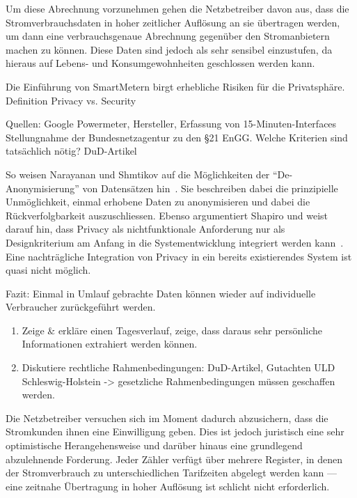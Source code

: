\documentclass[12pt,BCOR=8.5mm]{scrartcl}
\begin{document}
Um diese Abrechnung vorzunehmen gehen die Netzbetreiber davon aus, dass
die Stromverbrauchsdaten in hoher zeitlicher Auflösung an sie
übertragen werden, um dann eine verbrauchsgenaue Abrechnung gegenüber
den Stromanbietern machen zu können.
Diese Daten sind jedoch als sehr sensibel einzustufen, da hieraus auf
Lebens- und Konsumgewohnheiten geschlossen werden kann.


Die Einführung von SmartMetern birgt erhebliche Risiken für die
Privatsphäre. Definition Privacy vs. Security

Quellen: Google Powermeter, Hersteller, Erfassung von
15-Minuten-Interfaces
Stellungnahme der Bundesnetzagentur zu den §21 EnGG. Welche Kriterien
sind tatsächlich nötig?
DuD-Artikel

So weisen Narayanan und Shmtikov auf die Möglichkeiten der
``De-Anonymisierung'' von Datensätzen hin~\cite{narayanan2010pii}. Sie
beschreiben dabei die prinzipielle Unmöglichkeit, einmal erhobene Daten
zu anonymisieren und dabei die Rückverfolgbarkeit auszuschliessen.
Ebenso argumentiert Shapiro und weist darauf hin, dass Privacy als
nichtfunktionale Anforderung nur als Designkriterium am Anfang in die
Systementwicklung integriert werden kann~\cite{shapiro2010privacy}. Eine
nachträgliche Integration von Privacy in ein bereits existierendes
System ist quasi nicht möglich.

Fazit: Einmal in Umlauf gebrachte Daten können wieder auf individuelle
Verbraucher zurückgeführt werden.


\begin{enumerate}
  \item Zeige \& erkläre einen Tagesverlauf, zeige, dass daraus sehr
	persönliche Informationen extrahiert werden können.
  \item Diskutiere rechtliche Rahmenbedingungen: DuD-Artikel, Gutachten
	ULD Schleswig-Holstein -> gesetzliche Rahmenbedingungen müssen
	geschaffen werden.
\end{enumerate}



Die Netzbetreiber versuchen sich im Moment dadurch abzusichern, dass die
Stromkunden ihnen eine Einwilligung geben. Dies ist jedoch juristisch
eine sehr optimistische Herangehensweise  und darüber hinaus eine grundlegend abzulehnende Forderung.
Jeder Zähler verfügt über mehrere Register, in denen der Stromverbrauch
zu unterschiedlichen Tarifzeiten abgelegt werden kann --- eine zeitnahe
Übertragung in hoher Auflösung ist schlicht nicht erforderlich.
\end{document}
